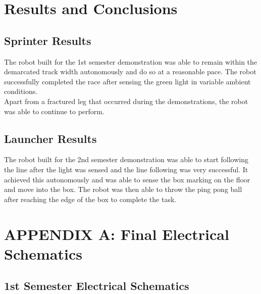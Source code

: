 \clearpage
\section{Results and Conclusions}
\label{sec:Results and Conclusions}
  \subsection{Sprinter Results}
  \label{sub:Sprinter Results}
    The robot built for the 1st semester demonstration was able to remain within the demarcated track width autonomously and do so at a reasonable pace. The robot successfully completed the race after sensing the green light in variable ambient conditions.\\

    Apart from a fractured leg that occurred during the demonstrations, the robot was able to continue to perform.

  \subsection{Launcher Results}
  \label{sub:Launcher Results}
    The robot built for the 2nd semester demonstration was able to start following the line after the light was sensed and the line following was very successful. It achieved this autonomously and was able to sense the box marking on the floor and move into the box. The robot was then able to throw the ping pong ball after reaching the edge of the box to complete the task.


\clearpage
\printbibliography


\section{APPENDIX A: Final Electrical Schematics}
\label{sec:APPENDIX A: Final Electrical Schematics}
  \subsection{1st Semester Electrical Schematics}
  \label{sub:1st Semester Electrical Schematics}

